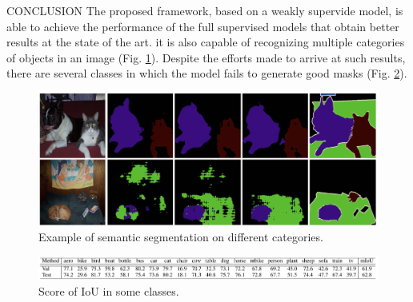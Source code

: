 \begin{frame}{CONCLUSION}
    The proposed framework, based on a weakly supervide model, is able to 
    achieve the performance of the full supervised models that obtain better 
    results at the state of the art. it is also capable of recognizing multiple categories of objects in an image (Fig. \ref{fig:segmentationCategories}). Despite the efforts made to arrive at such 
    results, there are several classes in which the model fails to generate 
    good masks (Fig. \ref{fig:classes}).
    \begin{figure}[h!]
        \centering
        \includegraphics[width = 0.6 \linewidth]{images/paper6/multiple segmentation.png}
        \centering
        \caption{Example of semantic segmentation on different categories.}
        \label{fig:segmentationCategories}
    \end{figure}
    \begin{figure}[h!]
        \centering
        \includegraphics[width = 1 \linewidth]{images/paper6/classes.png}
        \centering
        \caption{Score of IoU in some classes.}
        \label{fig:classes}
    \end{figure}
\end{frame}




